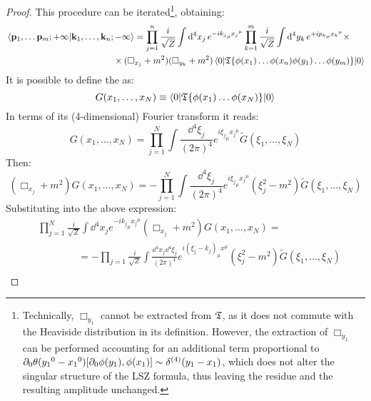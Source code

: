 \begin{proofbox}
\begin{proof}
    This procedure can be iterated\footnote{Technically, $ \Box_{y_1} $ cannot be extracted from $ \mathfrak{T} $, as it does not commute with the Heaviside distribution in its definition. However, the extraction of $ \Box_{y_1} $ can be performed accounting for an additional term proportional to $ \partial_0 \theta({y_1}^0 - {x_1}^0) [\partial_0 \phi(y_1),\phi(x_1)] \sim \delta^{(4)}(y_1 - x_1) $, which does not alter the singular structure of the LSZ formula, thus leaving the residue and the resulting amplitude unchanged.}, obtaining:
    \begin{equation*}
      \begin{split}
        & \braket{\mathbf{p}_1,\dots\mathbf{p}_m;+\infty | \mathbf{k}_1,\dots,\mathbf{k}_n;-\infty} = \prod_{j = 1}^n \frac{i}{\sqrt{Z}} \int \mathrm{d}^4x_j\, e^{-i {k_j}_\mu {x_j}^\mu} \prod_{k = 1}^m \frac{i}{\sqrt{Z}} \int \mathrm{d}^4y_k\, e^{+i {p_k}_\mu {x_k}^\mu} \times \\
        & \qquad \qquad \qquad \qquad \qquad \qquad \times (\Box_{x_j} + m^2) (\Box_{y_k} + m^2) \braket{0 | \mathfrak{T}\{\phi(x_1) \dots \phi(x_n) \phi(y_1) \dots \phi(y_m)\} | 0}
      \end{split}
    \end{equation*}
    It is possible to define the  as:
    \begin{equation}
      G(x_1, \dots, x_N) \equiv \braket{0 | \mathfrak{T}\{\phi(x_1) \dots \phi(x_N)\} | 0}
    \end{equation}
    In terms of its (4-dimensional) Fourier transform it reads:
    \begin{equation*}
      G(x_1, \dots, x_N) = \prod_{j = 1}^N \int \frac{\dd^4\xi_j}{(2\pi)^4} e^{i {\xi_j}_\mu {x_j}^\mu} \tilde{G}(\xi_1, \dots, \xi_N)
    \end{equation*}
    Then:
    \begin{equation*}
      (\Box_{x_j} + m^2) G(x_1, \dots, x_N) = - \prod_{j = 1}^N \int \frac{\dd^4\xi_j}{(2\pi)^4} e^{i {\xi_j}_\mu {x_j}^\mu} (\xi_j^2 - m^2) \tilde{G}(\xi_1, \dots, \xi_N)
    \end{equation*}
    Substituting into the above expression:
    \begin{equation*}
      \begin{split}
        & \prod_{j = 1}^N \frac{i}{\sqrt{Z}} \int \dd^4x_j e^{-i {k_j}_\mu {x_j}^\mu} (\Box_{x_j} + m^2) G(x_1, \dots, x_N) = \\
        & \qquad \qquad = - \prod_{j = 1} \frac{i}{\sqrt{Z}} \int \frac{\dd^4x_j \dd^4\xi_j}{(2\pi)^4} e^{i (\xi_j - k_j)_\mu x^\mu} (\xi_j^2 - m^2) \tilde{G}(\xi_1, \dots, \xi_N) \\

\end{split}
\end{equation*}
\end{proof}
\end{proofbox}
